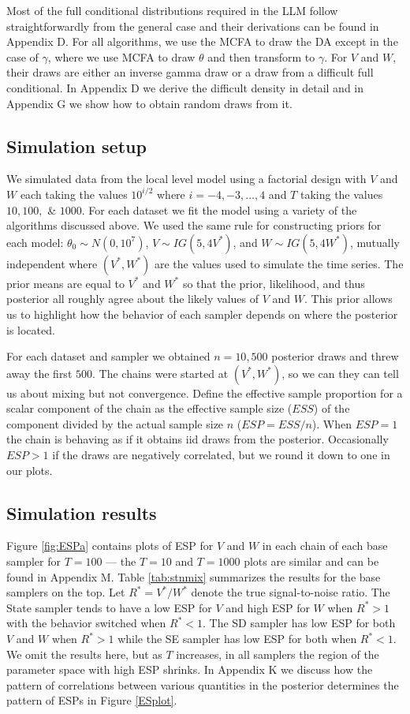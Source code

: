 \documentclass[12pt]{article}
\begin{document}
Most of the full conditional distributions required in the LLM follow straightforwardly from the general case and their derivations can be found in Appendix D. For all algorithms, we use the MCFA to draw the DA except in the case of $\gamma$, where we use MCFA to draw $\theta$ and then transform to $\gamma$. For $V$ and $W$, their draws are either an inverse gamma draw or a draw from a difficult full conditional. In Appendix D we derive the difficult density in detail and in Appendix G we show how to obtain random draws from it.

\subsection{Simulation setup}

We simulated data from the local level model using a factorial design with $V$ and $W$ each taking the values $10^{i/2}$ where $i=-4,-3,\dots,4$ and $T$ taking the values $10, 100,$ \& $1000$. For each dataset we fit the model using a variety of the algorithms discussed above. We used the same rule for constructing priors for each model: $\theta_0\sim N(0,10^7)$, $V\sim IG(5, 4V^*)$, and $W\sim IG(5, 4W^*)$, mutually independent where $(V^*,W^*)$ are the values used to simulate the time series. The prior means are equal to $V^*$ and $W^*$ so that the prior, likelihood, and thus posterior all roughly agree about the likely values of $V$ and $W$.  This prior allows us to highlight how the behavior of each sampler depends on where the posterior is located.

For each dataset and sampler we obtained $n=10,500$ posterior draws and threw away the first $500$. The chains were started at $(V^*, W^*)$, so we can they can tell us about mixing but not convergence. Define the effective sample proportion for a scalar component of the chain as the effective sample size ($ESS$) \citep{gelman2013bayesian} of the component divided by the actual sample size $n$ ($ESP=ESS/n$). When $ESP=1$ the chain is behaving as if it obtains iid draws from the posterior. Occasionally $ESP>1$ if the draws are negatively correlated, but we round it down to one in our plots.

\subsection{Simulation results}

Figure \ref{fig:ESPa} contains plots of ESP for $V$ and $W$ in each chain of each base sampler for $T=100$ --- the $T=10$ and $T=1000$ plots are similar and can be found in Appendix M. Table \ref{tab:stnmix} summarizes the results for the base samplers on the top. Let $R^*=V^*/W^*$ denote the true signal-to-noise ratio. The State sampler tends to have a low ESP for $V$ and high ESP for $W$ when $R^*>1$ with the behavior switched when $R^*<1$. The SD sampler has low ESP for both $V$ and $W$ when $R^*>1$ while the SE sampler has low ESP for both when $R^*<1$. We omit the results here, but as $T$ increases, in all samplers the region of the parameter space with high ESP shrinks. In Appendix K we discuss how the pattern of correlations between various quantities in the posterior determines the pattern of ESPs in Figure \ref{ESplot}. 
\end{document}
